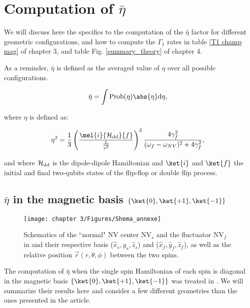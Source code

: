 \documentclass[a4paper, 11pt]{report}
\begin{document}
\chapter{Computation of $\bar \eta$}
\label{Appendix eta}
We will discuss here the specifics to the computation of the $\bar \eta$ factor for different geometric configurations, and how to compute the $\Gamma_1$ rates in table \ref{T1 champ mag} of chapter 3, and table Fig. \ref{summary_theory} of chapter 4.

As a reminder, $\bar \eta$ is defined as the averaged value of $\eta$ over all possible configurations.

\begin{equation}
\bar \eta = \int \rm{Prob}(\eta) \abs{\eta} d\eta,
\end{equation}

where $\eta$ is defined as:

\begin{equation}
\label{eq. eta debut annexe}
\eta^2=\frac{1}{3} \left(\frac{\mel{i}{\mathcal{H_{\rm dd}}}{f}}{\frac{J_0}{r^3}}\right)^2 \frac{4\gamma_f^2}{(\omega_f - \omega_{NV})^2+4\gamma_f^2},
\end{equation}

and where $\mathcal{H_{\rm dd}}$ is the dipole-dipole Hamiltonian and $\ket{i}$ and $\ket{f}$ the initial and final two-qubits states of the flip-flop or double flip process.

\section{$\bar \eta$ in the magnetic basis $\{ \ket{0}, \ket{+1}, \ket{-1}\}$}

\begin{figure}[h]
\centering
\texttt{[image: chapter 3/Figures/Shema\_annexe]}
\caption{Schematics of the ``normal" NV center NV$_s$ and the fluctuator NV$_f$ in and their respective basis ($\hat x_s,\hat y_s,\hat z_s$) and ($\hat x_f,\hat y_f,\hat z_f$), as well as the relative position $\vec{r}(r,\theta,\phi)$ between the two spins.}
\label{shema spins annexe}
\end{figure}

The computation of $\bar \eta$ when the single spin Hamiltonian of each spin is diagonal in the magnetic basis $\{ \ket{0}, \ket{+1}, \ket{-1}\}$ was treated in \citep{choi2017depolarization}. We will summarize their results here and consider a few different geometries than the ones presented in the article.
\end{document}
